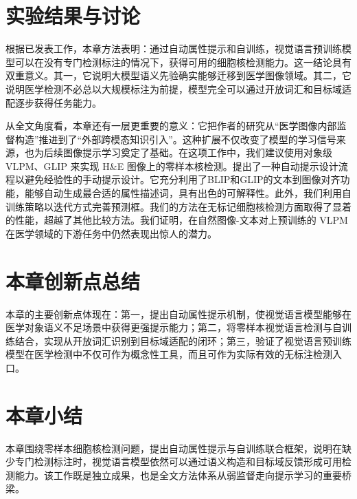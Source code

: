 \section{实验结果与讨论}
根据已发表工作，本章方法表明：通过自动属性提示和自训练，视觉语言预训练模型可以在没有专门检测标注的情况下，获得可用的细胞核检测能力。这一结论具有双重意义。其一，它说明大模型语义先验确实能够迁移到医学图像领域。其二，它说明医学检测不必总以大规模标注为前提，模型完全可以通过开放词汇和目标域适配逐步获得任务能力。

从全文角度看，本章还有一层更重要的意义：它把作者的研究从“医学图像内部监督构造”推进到了“外部跨模态知识引入”。这种扩展不仅改变了模型的学习信号来源，也为后续图像提示学习奠定了基础。在这项工作中，我们建议使用对象级 VLPM、GLIP 来实现 H\&E 图像上的零样本核检测。提出了一种自动提示设计流程以避免经验性的手动提示设计。它充分利用了BLIP和GLIP的文本到图像对齐功能，能够自动生成最合适的属性描述词，具有出色的可解释性。此外，我们利用自训练策略以迭代方式完善预测框。我们的方法在无标记细胞核检测方面取得了显着的性能，超越了其他比较方法。我们证明，在自然图像-文本对上预训练的 VLPM 在医学领域的下游任务中仍然表现出惊人的潜力。

\section{本章创新点总结}
本章的主要创新点体现在：第一，提出自动属性提示机制，使视觉语言模型能够在医学对象语义不足场景中获得更强提示能力；第二，将零样本视觉语言检测与自训练结合，实现从开放词汇识别到目标域适配的闭环；第三，验证了视觉语言预训练模型在医学检测中不仅可作为概念性工具，而且可作为实际有效的无标注检测入口。

\section{本章小结}
本章围绕零样本细胞核检测问题，提出自动属性提示与自训练联合框架，说明在缺少专门检测标注时，视觉语言模型依然可以通过语义构造和目标域反馈形成可用检测能力。该工作既是独立成果，也是全文方法体系从弱监督走向提示学习的重要桥梁。
